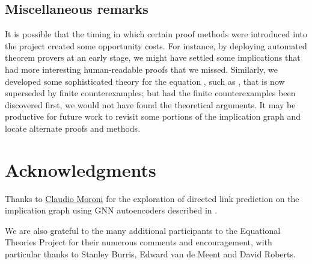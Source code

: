 \subsection{Miscellaneous remarks}

It is possible that the timing in which certain proof methods were introduced into the project created some opportunity costs.  For instance, by deploying automated theorem provers at an early stage, we might have settled some implications that had more interesting human-readable proofs that we missed.  Similarly, we developed some sophisticated theory for the equation , such as , that is now superseded by finite counterexamples; but had the finite counterexamples been discovered first, we would not have found the theoretical arguments.  It may be productive for future work to revisit some portions of the implication graph and locate alternate proofs and methods.


\section*{Acknowledgments}

Thanks to \href{https://github.com/ClaudMor}{Claudio Moroni} for the exploration of directed link prediction
on the implication graph using GNN autoencoders described in .

We are also grateful to the many additional participants to the Equational Theories Project for their numerous comments and encouragement, with particular thanks to  Stanley Burris, Edward van de Meent and David Roberts.

